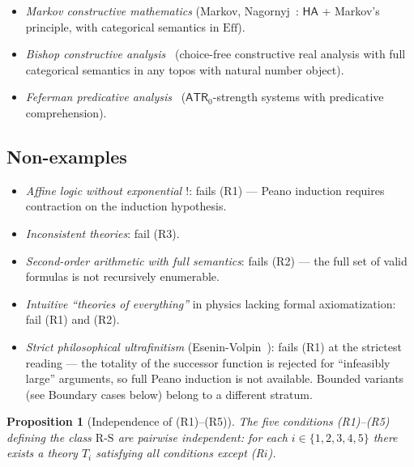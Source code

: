 \documentclass[11pt]{article}
\theoremstyle{plain}
\newtheorem{proposition}[theorem]{Proposition}
\theoremstyle{definition}
\newcommand{\RS}{\mathrm{R\text{-}S}}
\begin{document}
\begin{itemize}
\item \emph{Markov constructive mathematics} (Markov, Nagornyj~\cite{MarkovNagornyj1988}: $\mathsf{HA}$ + Markov's principle, with categorical semantics in $\mathrm{Eff}$).
\item \emph{Bishop constructive analysis}~\cite{Bishop1967,BridgesVita2006} (choice-free constructive real analysis with full categorical semantics in any topos with natural number object).
\item \emph{Feferman predicative analysis}~\cite{Feferman1964} ($\mathsf{ATR}_0$-strength systems with predicative comprehension).
\end{itemize}

\subsection{Non-examples}

\begin{itemize}
\item \emph{Affine logic without exponential $!$}: fails (R1) --- Peano induction requires contraction on the induction hypothesis.
\item \emph{Inconsistent theories}: fail (R3).
\item \emph{Second-order arithmetic with full semantics}: fails (R2) --- the full set of valid formulas is not recursively enumerable.
\item \emph{Intuitive ``theories of everything''} in physics lacking formal axiomatization: fail (R1) and (R2).
\item \emph{Strict philosophical ultrafinitism} (Esenin-Volpin~\cite{EseninVolpin1961,EseninVolpin1970}): fails (R1) at the strictest reading --- the totality of the successor function is rejected for ``infeasibly large'' arguments, so full Peano induction is not available. Bounded variants (see Boundary cases below) belong to a different stratum.
\end{itemize}

\begin{proposition}[Independence of (R1)--(R5)]\label{prop:rs-independence}
The five conditions (R1)--(R5) defining the class $\RS$ are pairwise independent: for each $i \in \{1, 2, 3, 4, 5\}$ there exists a theory $T_i$ satisfying all conditions except (R$i$).
\end{proposition}
\end{document}

